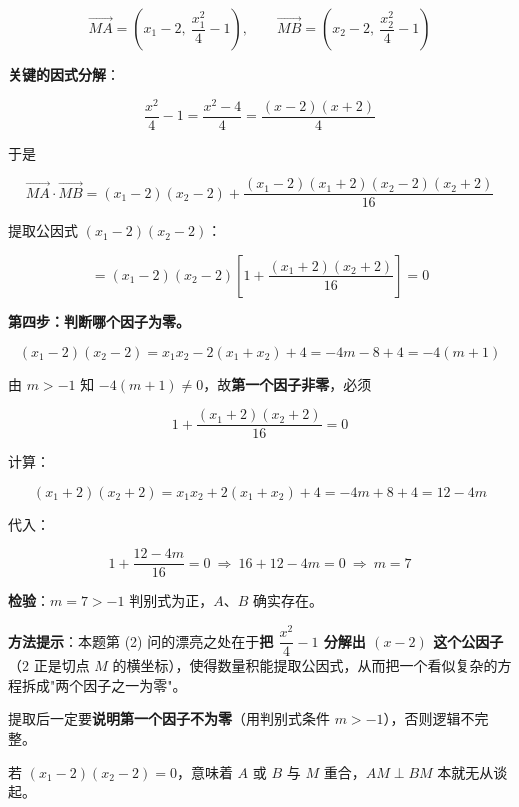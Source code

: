 \begin{answer}
\nopagebreak[4]
\[\overrightarrow{MA}=\left(x_1-2,\ \frac{x_1^{2}}4-1\right),\qquad \overrightarrow{MB}=\left(x_2-2,\ \frac{x_2^{2}}4-1\right)\]

\textbf{关键的因式分解}：

\nopagebreak[4]
\[\frac{x^{2}}4-1=\frac{x^{2}-4}4=\frac{(x-2)(x+2)}4\]

于是

\nopagebreak[4]
\[\overrightarrow{MA}\cdot\overrightarrow{MB}=\left(x_1-2\right)\left(x_2-2\right)+\frac{\left(x_1-2\right)\left(x_1+2\right)\left(x_2-2\right)\left(x_2+2\right)}{16}\]

提取公因式 $\left(x_1-2\right)\left(x_2-2\right)$：

\nopagebreak[4]
\[=\left(x_1-2\right)\left(x_2-2\right)\left[1+\frac{\left(x_1+2\right)\left(x_2+2\right)}{16}\right]=0\]

\textbf{第四步：判断哪个因子为零。}

\nopagebreak[4]
\[\left(x_1-2\right)\left(x_2-2\right)=x_1x_2-2\left(x_1+x_2\right)+4=-4m-8+4=-4(m+1)\]

由 $m>-1$ 知 $-4(m+1)\ne0$，故\textbf{第一个因子非零}，必须

\nopagebreak[4]
\[1+\frac{\left(x_1+2\right)\left(x_2+2\right)}{16}=0\]

计算：

\nopagebreak[4]
\[\left(x_1+2\right)\left(x_2+2\right)=x_1x_2+2\left(x_1+x_2\right)+4=-4m+8+4=12-4m\]

代入：

\nopagebreak[4]
\[1+\frac{12-4m}{16}=0\ \Longrightarrow\ 16+12-4m=0\ \Longrightarrow\ m=7\]

\textbf{检验}：$m=7>-1$  判别式为正，$A$、$B$ 确实存在。

\begin{gktip}
\textbf{方法提示}：本题第 (2) 问的漂亮之处在于\textbf{把 $\dfrac{x^{2}}4-1$ 分解出 $(x-2)$ 这个公因子}（$2$ 正是切点 $M$ 的横坐标），使得数量积能提取公因式，从而把一个看似复杂的方程拆成"两个因子之一为零"。

提取后一定要\textbf{说明第一个因子不为零}（用判别式条件 $m>-1$），否则逻辑不完整。

若 $\left(x_1-2\right)\left(x_2-2\right)=0$，意味着 $A$ 或 $B$ 与 $M$ 重合，$AM\perp BM$ 本就无从谈起。
\end{gktip}



\par\medskip

\end{answer}
